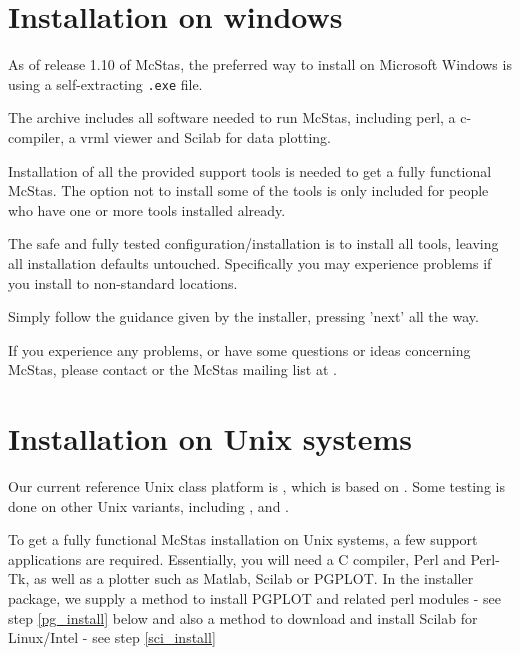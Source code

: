 \section{Installation on windows}
\label{s:win32_install}
As of release 1.10 of McStas, the preferred way to install on
Microsoft Windows is using a self-extracting \texttt{.exe} file.

\noindent The archive includes all software needed to run McStas, including perl, a
c-compiler, a vrml viewer and Scilab for data plotting.

\noindent Installation of all the provided support tools is needed to get a fully
functional McStas. The option not to install some of the tools is only
included for people who have one or more tools installed already.

\noindent The safe and fully tested configuration/installation is to install all
tools, leaving all installation defaults untouched. Specifically you
may experience problems if you install to non-standard locations.

\noindent Simply follow the guidance given by the installer, pressing 'next' all
the way.

\noindent If you experience any problems, or have some questions or ideas
concerning McStas, please contact
or the McStas mailing list at .


\section{Installation on Unix systems}
\label{s:unix_install}
Our current reference Unix class platform is
, which is
based on . Some testing is done on other
Unix variants, including ,
and .


\noindent To get a fully functional McStas installation on Unix systems, a few support
applications are required. Essentially, you will need a C compiler,
Perl and Perl-Tk, as well as a plotter such as Matlab, Scilab or
PGPLOT. In the installer package, we supply a method to install PGPLOT
and related perl modules - see step \ref{pg_install} below and also
a method to download and install Scilab for Linux/Intel - see step \ref{sci_install}

